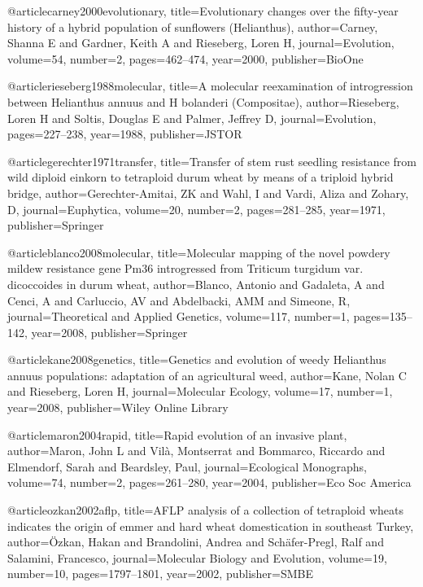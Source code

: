 {@article{carney2000evolutionary,
  title={Evolutionary changes over the fifty-year history of a hybrid population of sunflowers (Helianthus)},
  author={Carney, Shanna E and Gardner, Keith A and Rieseberg, Loren H},
  journal={Evolution},
  volume={54},
  number={2},
  pages={462--474},
  year={2000},
  publisher={BioOne}
}

@article{rieseberg1988molecular,
  title={A molecular reexamination of introgression between Helianthus annuus and H bolanderi (Compositae)},
  author={Rieseberg, Loren H and Soltis, Douglas E and Palmer, Jeffrey D},
  journal={Evolution},
  pages={227--238},
  year={1988},
  publisher={JSTOR}
}

@article{gerechter1971transfer,
  title={Transfer of stem rust seedling resistance from wild diploid einkorn to tetraploid durum wheat by means of a triploid hybrid bridge},
  author={Gerechter-Amitai, ZK and Wahl, I and Vardi, Aliza and Zohary, D},
  journal={Euphytica},
  volume={20},
  number={2},
  pages={281--285},
  year={1971},
  publisher={Springer}
}

@article{blanco2008molecular,
  title={Molecular mapping of the novel powdery mildew resistance gene Pm36 introgressed from Triticum turgidum var. dicoccoides in durum wheat},
  author={Blanco, Antonio and Gadaleta, A and Cenci, A and Carluccio, AV and Abdelbacki, AMM and Simeone, R},
  journal={Theoretical and Applied Genetics},
  volume={117},
  number={1},
  pages={135--142},
  year={2008},
  publisher={Springer}
}

@article{kane2008genetics,
  title={Genetics and evolution of weedy Helianthus annuus populations: adaptation of an agricultural weed},
  author={Kane, Nolan C and Rieseberg, Loren H},
  journal={Molecular Ecology},
  volume={17},
  number={1},
  year={2008},
  publisher={Wiley Online Library}
}

@article{maron2004rapid,
  title={Rapid evolution of an invasive plant},
  author={Maron, John L and Vil{\`a}, Montserrat and Bommarco, Riccardo and Elmendorf, Sarah and Beardsley, Paul},
  journal={Ecological Monographs},
  volume={74},
  number={2},
  pages={261--280},
  year={2004},
  publisher={Eco Soc America}
}

@article{ozkan2002aflp,
  title={AFLP analysis of a collection of tetraploid wheats indicates the origin of emmer and hard wheat domestication in southeast Turkey},
  author={{\"O}zkan, Hakan and Brandolini, Andrea and Sch{\"a}fer-Pregl, Ralf and Salamini, Francesco},
  journal={Molecular Biology and Evolution},
  volume={19},
  number={10},
  pages={1797--1801},
  year={2002},
  publisher={SMBE}
}

}
